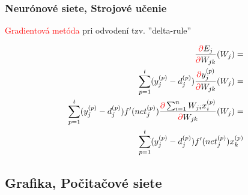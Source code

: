 \documentclass{beamer}
\begin{document}
\begin{frame}
\frametitle{Neurónové siete, Strojové učenie}

\textcolor{red}{Gradientová metóda} pri odvodení tzv. ''delta-rule''

\def\rpartial{\textcolor{red}{\partial}}

\begin{align*}
\dfrac{\rpartial E_j}{\rpartial W_{jk}} (W_j) = \\
\sum_{p=1}^{t} (y^{(p)}_j - d^{(p)}_j)     \dfrac{\rpartial y^{(p)}_j} {\rpartial W_{jk}} (W_j)= \\
\sum_{p=1}^{t} (y^{(p)}_j - d^{(p)}_j)     f'(net_j^{(p)}) \dfrac{\rpartial \sum_{i=1}^{n} W_{ji} x_i^{(p)}}{\rpartial W_{jk}} (W_j)= \\
\sum_{p=1}^{t} (y^{(p)}_j - d^{(p)}_j)     f'(net_j^{(p)}) x_k^{(p)} \\
\end{align*}

\end{frame}

\subsection{Grafika, Počitačové siete}
% 
% 
\end{document}
